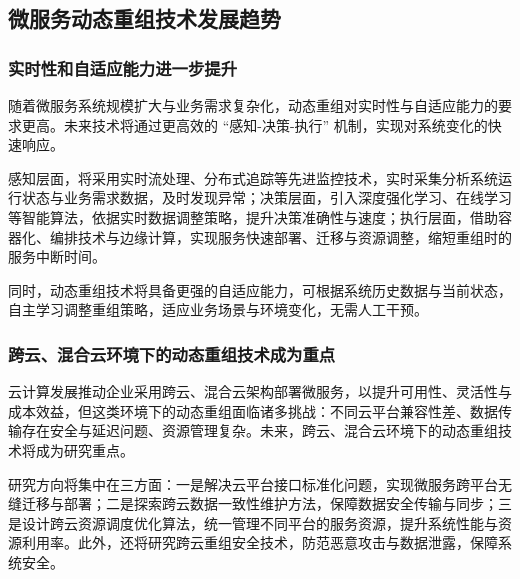 \documentclass[lang=cn,11pt,a4paper,cite=number]{elegantpaper}
\begin{document}
\subsection{微服务动态重组技术发展趋势}
\subsubsection{实时性和自适应能力进一步提升}
\label{sec:x1}
随着微服务系统规模扩大与业务需求复杂化，动态重组对实时性与自适应能力的要求更高。未来技术将通过更高效的 “感知-决策-执行” 机制，实现对系统变化的快速响应。\par
感知层面，将采用实时流处理、分布式追踪等先进监控技术，实时采集分析系统运行状态与业务需求数据，及时发现异常；决策层面，引入深度强化学习、在线学习等智能算法，依据实时数据调整策略，提升决策准确性与速度；执行层面，借助容器化、编排技术与边缘计算，实现服务快速部署、迁移与资源调整，缩短重组时的服务中断时间。\par
同时，动态重组技术将具备更强的自适应能力，可根据系统历史数据与当前状态，自主学习调整重组策略，适应业务场景与环境变化，无需人工干预。
\subsubsection{跨云、混合云环境下的动态重组技术成为重点}
\label{sec:x1}
云计算发展推动企业采用跨云、混合云架构部署微服务，以提升可用性、灵活性与成本效益，但这类环境下的动态重组面临诸多挑战：不同云平台兼容性差、数据传输存在安全与延迟问题、资源管理复杂。未来，跨云、混合云环境下的动态重组技术将成为研究重点。\par
研究方向将集中在三方面：一是解决云平台接口标准化问题，实现微服务跨平台无缝迁移与部署；二是探索跨云数据一致性维护方法，保障数据安全传输与同步；三是设计跨云资源调度优化算法，统一管理不同平台的服务资源，提升系统性能与资源利用率。此外，还将研究跨云重组安全技术，防范恶意攻击与数据泄露，保障系统安全。
\end{document}
